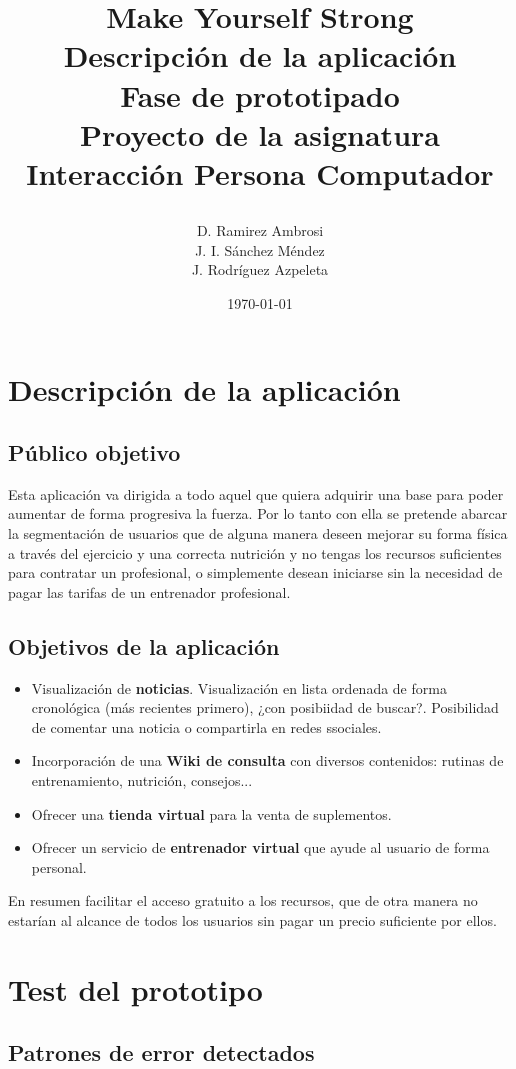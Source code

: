 \documentclass[a4paper]{article}
\date{}
\author{D. Ramirez Ambrosi \\ J. I. Sánchez Méndez \\ J. Rodríguez Azpeleta}
\title{\begin{center}
\textbf{\Huge{Make Yourself Strong}} \\ Descripción de la aplicación \\ Fase de prototipado \\Proyecto de la asignatura Interacción Persona Computador
\end{center}}
\date{\today}
\renewcommand\listfigurename{\centering LISTA DE FIGURAS}
\begin{document}
\maketitle

\thispagestyle{empty}%
\newpage
\tableofcontents%
\thispagestyle{empty}
\newpage





\setcounter{page}{1}%

\section{Descripción de la aplicación}

\subsection{Público objetivo}
Esta aplicación va dirigida a todo aquel que quiera adquirir una base para poder aumentar de 
forma progresiva la fuerza. Por lo tanto con ella se pretende abarcar la segmentación de usuarios que de alguna manera 
deseen mejorar su forma física a través del ejercicio y una correcta nutrición y no tengas los recursos 
suficientes para contratar un profesional, o simplemente desean iniciarse sin la necesidad de pagar las tarifas
de un entrenador profesional.

\subsection{Objetivos de la aplicación}

\begin{itemize}
	\item	Visualización de \textbf{noticias}. Visualización en lista ordenada de forma cronológica (más recientes primero), ¿con posibiidad de buscar?. Posibilidad de comentar una noticia o compartirla en redes ssociales.
	
	\item	Incorporación de una \textbf{Wiki de consulta} con diversos contenidos: rutinas de entrenamiento, nutrición, consejos...
	
	\item	Ofrecer una \textbf{tienda virtual} para la venta de suplementos.
	
	\item	Ofrecer un servicio de \textbf{entrenador virtual} que ayude al usuario de forma personal.
\end{itemize}

En resumen facilitar el acceso gratuito a los recursos, que de otra manera no estarían al alcance de todos los
usuarios sin pagar un precio suficiente por ellos.

\section{Test del prototipo}

\subsection{Patrones de error detectados}
\end{document}
